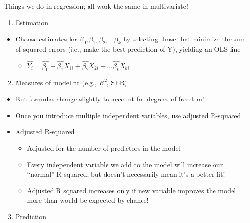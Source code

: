 \documentclass[
  8pt,
  ignorenonframetext,
  dvipsnames]{beamer}
\providecommand{\tightlist}{%
  \setlength{\itemsep}{0pt}\setlength{\parskip}{0pt}}
\let\olditem\item
\renewcommand{\item}{%
  \olditem\vspace{4pt}
}
\begin{document}
\begin{frame}{Things we do in regression; all work the same in
multivariate!}
\protect\hypertarget{things-we-do-in-regression-all-work-the-same-in-multivariate}{}

\begin{enumerate}
\tightlist
\item
  Estimation
\end{enumerate}

\begin{itemize}
\tightlist
\item
  Choose estimates for \(\beta_0, \beta_1, \beta_2, ... \beta_k\) by
  selecting those that minimize the sum of squared errors (i.e., make
  the best prediction of Y), yielding an OLS line

  \begin{itemize}
  \tightlist
  \item
    \(\hat{Y_i} = \hat{\beta_0} + \hat{\beta_1} X_{1i} + \hat{\beta_2} X_{2i} + ... \hat{\beta_k} X_{ki}\)
  \end{itemize}
\end{itemize}

\begin{enumerate}
\setcounter{enumi}{1}
\tightlist
\item
  Measures of model fit (e.g., \(R^2\), SER)
\end{enumerate}

\begin{itemize}
\tightlist
\item
  But formulas change slightly to account for degrees of freedom!
\item
  Once you introduce multiple independent variables, use adjusted
  R-squared
\item
  Adjusted R-squared

  \begin{itemize}
  \tightlist
  \item
    Adjusted for the number of predictors in the model
  \item
    Every independent variable we add to the model will increase our
    ``normal'' R-squared; but doesn't necessarily mean it's a better
    fit!
  \item
    Adjusted R squared increases only if new variable improves the model
    more than would be expected by chance!
  \end{itemize}
\end{itemize}

\begin{enumerate}
\setcounter{enumi}{2}
\tightlist
\item
  Prediction
\end{enumerate}


\end{frame}
\end{document}
